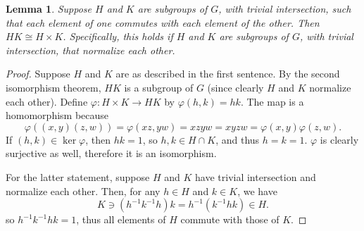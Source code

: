 \documentclass[10pt]{article}
\newtheorem*{lem}{Lemma}
\begin{document}
\begin{lem}
Suppose $H$ and $K$ are subgroups of $G$, with trivial intersection, such that each element of one commutes with each element of the other.  Then $HK \cong H \times K$.  Specifically, this holds if $H$ and $K$ are subgroups of $G$, with trivial intersection, that normalize each other.
\end{lem}
\begin{proof}
Suppose $H$ and $K$ are as described in the first sentence.  By the second isomorphism theorem, $HK$ is a subgroup of $G$ (since clearly $H$ and $K$ normalize each other).  Define $\varphi: H \times K \rightarrow HK$ by $\varphi(h,k) = hk$.  The map is a homomorphism because
$$
\varphi((x,y)(z,w)) = \varphi(xz,yw) = xzyw = xyzw = \varphi(x,y)\varphi(z,w).
$$
If $(h,k) \in \ker \varphi$, then $hk = 1$, so $h,k \in H \cap K$, and thus $h = k = 1$.  $\varphi$ is clearly surjective as well, therefore it is an isomorphism.

For the latter statement, suppose $H$ and $K$ have trivial intersection and normalize each other.  Then, for any $h \in H$ and $k \in K$, we have
$$
K \ni (h^{-1}k^{-1}h)k = h^{-1}(k^{-1}hk) \in H.
$$
so $h^{-1}k^{-1}hk = 1$, thus all elements of $H$ commute with those of $K$.
\end{proof}
\end{document}
